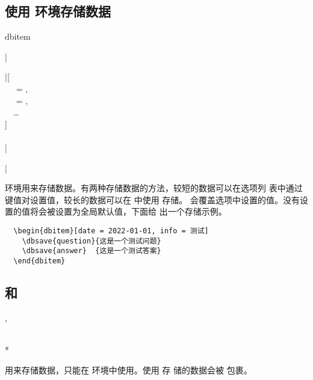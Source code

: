 \documentclass[full]{l3doc}
\begin{document}
\begin{documentation}
\subsection{使用  环境存储数据}

\begin{environment}[added=2022-01-05]{dbitem}
  \begin{syntax}
    |\begin{dbitem}|[ \\
    ~~ = , \\
    ~~ = , \\
    ~~\ldots{} \\
    ] \\
    ~~ \\
    |\end{dbitem}|
  \end{syntax}

   环境用来存储数据。有两种存储数据的方法，较短的数据可以在选项列
  表中通过键值对设置值，较长的数据可以在  中使用  存储。
  会覆盖选项中设置的值。没有设置的值将会被设置为全局默认值，下面给
  出一个存储示例。
\end{environment}

\begin{verbatim}
  \begin{dbitem}[date = 2022-01-01, info = 测试]
    \dbsave{question}{这是一个测试问题}
    \dbsave{answer}  {这是一个测试答案}
  \end{dbitem}
\end{verbatim}

\subsection{ 和 }

\begin{function}[added=2022-01-05, updated=2022-01-08]{\dbsave, \dbsave*}
  \begin{syntax}
        \\
    *  
  \end{syntax}

   用来存储数据，只能在  环境中使用。使用  存
  储的数据会被  包裹。
\end{function}


\end{documentation}
\end{document}
